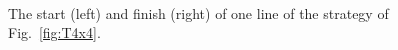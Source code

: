 \begin{figure}[b]
{\scriptsize 
\ \hfill {} 
\ \hfill {} 
\hfill \  
}
\caption{The start (left) and finish (right)
of one line of the strategy of Fig.~\ref{fig:T4x4}.}
\label{fig:B4}
\end{figure}
